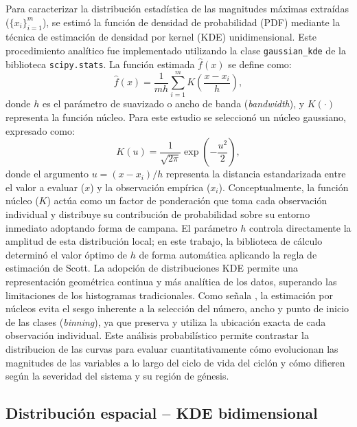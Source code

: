 Para caracterizar la distribución estadística de las magnitudes máximas extraídas ($\{x_i\}_{i=1}^{m}$), se estimó la función de densidad de probabilidad (PDF) mediante la técnica de estimación de densidad por kernel (KDE) unidimensional. Este procedimiento analítico fue implementado utilizando la clase \texttt{gaussian\_kde} de la biblioteca \texttt{scipy.stats}. La función estimada $\hat{f}(x)$ se define como:
\begin{equation}
    \hat{f}(x) = \frac{1}{m h} \sum_{i=1}^{m} K\left(\frac{x - x_i}{h}\right),
\label{eq:kde_pdf}
\end{equation}
donde $h$ es el parámetro de suavizado o ancho de banda (\textit{bandwidth}), y $K(\cdot)$ representa la función núcleo. Para este estudio se seleccionó un núcleo gaussiano, expresado como:
\begin{equation}
    K(u) = \frac{1}{\sqrt{2\pi}} \exp\left(-\frac{u^2}{2}\right),
\label{eq:gaussian_kernel}
\end{equation}
donde el argumento $u = (x - x_i)/h$ representa la distancia estandarizada entre el valor a evaluar ($x$) y la observación empírica ($x_i$). Conceptualmente, la función núcleo ($K$) actúa como un factor de ponderación que toma cada observación individual y distribuye su contribución de probabilidad sobre su entorno inmediato adoptando forma de campana. El parámetro $h$ controla directamente la amplitud de esta distribución local; en este trabajo, la biblioteca de cálculo determinó el valor óptimo de $h$ de forma automática aplicando la regla de estimación de Scott. 
%
La adopción de distribuciones KDE permite una representación geométrica continua y más analítica de los datos, superando las limitaciones de los histogramas tradicionales. Como señala \citet{weglarczyk2018kernel}, la estimación por núcleos evita el sesgo inherente a la selección del número, ancho y punto de inicio de las clases (\textit{binning}), ya que preserva y utiliza la ubicación exacta de cada observación individual. Este análisis probabilístico permite contrastar la distribucion de las curvas para evaluar cuantitativamente cómo evolucionan las magnitudes de las variables a lo largo del ciclo de vida del ciclón y cómo difieren según la severidad del sistema y su región de génesis.

\subsection{Distribución espacial -- KDE bidimensional}\label{subsec:kde_localizacion}

